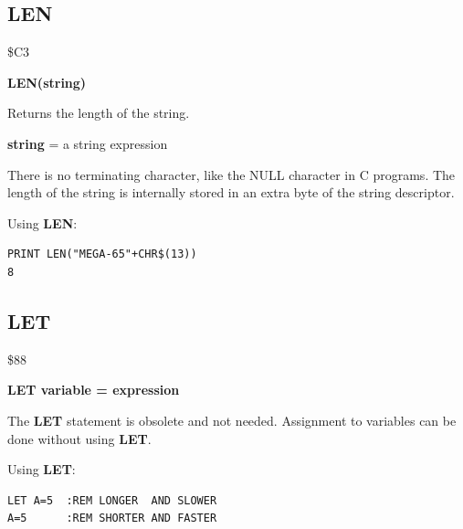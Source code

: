
\newpage
\subsection{LEN}
\begin{description}[leftmargin=2cm,style=nextline]
\item [Token:] \$C3
\item [Format:] {\bf LEN(string)}
\item [Usage:] Returns the length of the string.

               {\bf string} = a string expression

\item [Remarks:] There is no terminating character, like the
                 NULL character in C programs. The length of
                 the string is internally stored in an extra byte
                 of the string descriptor.

\item [Example:] Using {\bf LEN}:
\begin{tcolorbox}[colback=black,coltext=white]
\verbatimfont{\codefont}
\begin{verbatim}
PRINT LEN("MEGA-65"+CHR$(13))
8
\end{verbatim}
\end{tcolorbox}
\end{description}


\newpage
\subsection{LET}
\begin{description}[leftmargin=2cm,style=nextline]
\item [Token:] \$88
\item [Format:] {\bf LET variable = expression}
\item [Usage:] The {\bf LET} statement is obsolete and not needed.
               Assignment to variables can be done without using
               {\bf LET}.

\item [Example:] Using {\bf LET}:
\begin{tcolorbox}[colback=black,coltext=white]
\verbatimfont{\codefont}
\begin{verbatim}
LET A=5  :REM LONGER  AND SLOWER
A=5      :REM SHORTER AND FASTER
\end{verbatim}
\end{tcolorbox}
\end{description}

